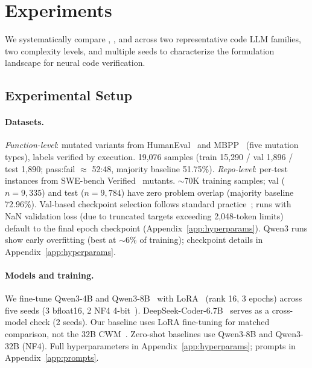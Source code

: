 \section{Experiments}
\label{sec:experiments}

We systematically compare \cls{}, \cwm{}, and \traj{} across two representative code LLM families, two complexity levels, and multiple seeds to characterize the formulation landscape for neural code verification.

\subsection{Experimental Setup}
\label{sec:setup}

\paragraph{Datasets.}
\emph{Function-level}: mutated variants from HumanEval~\cite{chen2021humaneval} and MBPP~\cite{austin2021mbpp} (five mutation types), labels verified by execution. 19,076 samples (train 15,290 / val 1,896 / test 1,890; pass:fail $\approx$ 52:48, majority baseline 51.75\%).
\emph{Repo-level}: per-test instances from SWE-bench Verified~\cite{chowdhury2024swebenchverified} mutants. ${\sim}$70K training samples; val ($n{=}9{,}335$) and test ($n{=}9{,}784$) have zero problem overlap (majority baseline 72.96\%). Val-based checkpoint selection follows standard practice~\cite{jimenez2024swebench}; runs with NaN validation loss (due to truncated targets exceeding 2,048-token limits) default to the final epoch checkpoint (Appendix~\ref{app:hyperparams}). Qwen3 \cwm{} runs show early overfitting (best at ${\sim}$6\% of training); checkpoint details in Appendix~\ref{app:hyperparams}.

\paragraph{Models and training.}
We fine-tune Qwen3-4B and Qwen3-8B~\cite{qwen2025qwen3} with LoRA~\cite{hu2022lora} (rank 16, 3 epochs) across five seeds (3 bfloat16, 2 NF4 4-bit~\cite{dettmers2024qlora}). DeepSeek-Coder-6.7B~\cite{guo2024deepseekcoder} serves as a cross-model check (2 seeds). Our \cwm{} baseline uses LoRA fine-tuning for matched comparison, not the 32B CWM~\cite{meta2025cwm}. Zero-shot baselines use Qwen3-8B and Qwen3-32B (NF4). Full hyperparameters in Appendix~\ref{app:hyperparams}; prompts in Appendix~\ref{app:prompts}.

